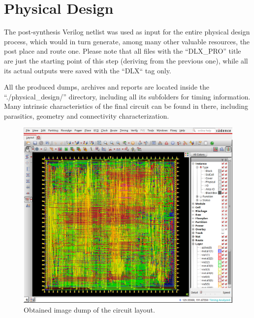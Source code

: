 \section{Physical Design}
The post-synthesis Verilog netlist was used as input for the entire physical design process, which would in turn generate, among many other valuable resources, the post place and route one. Please note that all files with the ``DLX\_PRO'' title are just the starting point of this step (deriving from the previous one), while all its actual outputs were saved with the ``DLX`` tag only.

All the produced dumps, archives and reports are located inside the ``./physical\_design/'' directory, including all its subfolders for timing information. Many intrinsic characteristics of the final circuit can be found in there, including parasitics, geometry and connectivity characterization.

\begin{figure}[!ht]
\centering
\includegraphics[width=\textwidth]{./chapters/figures/DLX_dump.png} 
\caption{Obtained image dump of the circuit layout.}
\end{figure}